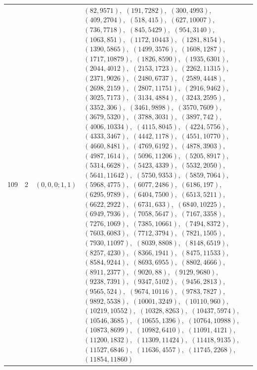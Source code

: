 \documentclass[11pt]{article}
\begin{document}
\begin{longtable}{@{}rrl>{\raggedright\arraybackslash}p{}@{}}
109 & 2 & $(0,0,0;1,1)$ & $(82,9571)$,\allowbreak\ $(191,7282)$,\allowbreak\ $(300,4993)$,\allowbreak\ $(409,2704)$,\allowbreak\ $(518,415)$,\allowbreak\ $(627,10007)$,\allowbreak\ $(736,7718)$,\allowbreak\ $(845,5429)$,\allowbreak\ $(954,3140)$,\allowbreak\ $(1063,851)$,\allowbreak\ $(1172,10443)$,\allowbreak\ $(1281,8154)$,\allowbreak\ $(1390,5865)$,\allowbreak\ $(1499,3576)$,\allowbreak\ $(1608,1287)$,\allowbreak\ $(1717,10879)$,\allowbreak\ $(1826,8590)$,\allowbreak\ $(1935,6301)$,\allowbreak\ $(2044,4012)$,\allowbreak\ $(2153,1723)$,\allowbreak\ $(2262,11315)$,\allowbreak\ $(2371,9026)$,\allowbreak\ $(2480,6737)$,\allowbreak\ $(2589,4448)$,\allowbreak\ $(2698,2159)$,\allowbreak\ $(2807,11751)$,\allowbreak\ $(2916,9462)$,\allowbreak\ $(3025,7173)$,\allowbreak\ $(3134,4884)$,\allowbreak\ $(3243,2595)$,\allowbreak\ $(3352,306)$,\allowbreak\ $(3461,9898)$,\allowbreak\ $(3570,7609)$,\allowbreak\ $(3679,5320)$,\allowbreak\ $(3788,3031)$,\allowbreak\ $(3897,742)$,\allowbreak\ $(4006,10334)$,\allowbreak\ $(4115,8045)$,\allowbreak\ $(4224,5756)$,\allowbreak\ $(4333,3467)$,\allowbreak\ $(4442,1178)$,\allowbreak\ $(4551,10770)$,\allowbreak\ $(4660,8481)$,\allowbreak\ $(4769,6192)$,\allowbreak\ $(4878,3903)$,\allowbreak\ $(4987,1614)$,\allowbreak\ $(5096,11206)$,\allowbreak\ $(5205,8917)$,\allowbreak\ $(5314,6628)$,\allowbreak\ $(5423,4339)$,\allowbreak\ $(5532,2050)$,\allowbreak\ $(5641,11642)$,\allowbreak\ $(5750,9353)$,\allowbreak\ $(5859,7064)$,\allowbreak\ $(5968,4775)$,\allowbreak\ $(6077,2486)$,\allowbreak\ $(6186,197)$,\allowbreak\ $(6295,9789)$,\allowbreak\ $(6404,7500)$,\allowbreak\ $(6513,5211)$,\allowbreak\ $(6622,2922)$,\allowbreak\ $(6731,633)$,\allowbreak\ $(6840,10225)$,\allowbreak\ $(6949,7936)$,\allowbreak\ $(7058,5647)$,\allowbreak\ $(7167,3358)$,\allowbreak\ $(7276,1069)$,\allowbreak\ $(7385,10661)$,\allowbreak\ $(7494,8372)$,\allowbreak\ $(7603,6083)$,\allowbreak\ $(7712,3794)$,\allowbreak\ $(7821,1505)$,\allowbreak\ $(7930,11097)$,\allowbreak\ $(8039,8808)$,\allowbreak\ $(8148,6519)$,\allowbreak\ $(8257,4230)$,\allowbreak\ $(8366,1941)$,\allowbreak\ $(8475,11533)$,\allowbreak\ $(8584,9244)$,\allowbreak\ $(8693,6955)$,\allowbreak\ $(8802,4666)$,\allowbreak\ $(8911,2377)$,\allowbreak\ $(9020,88)$,\allowbreak\ $(9129,9680)$,\allowbreak\ $(9238,7391)$,\allowbreak\ $(9347,5102)$,\allowbreak\ $(9456,2813)$,\allowbreak\ $(9565,524)$,\allowbreak\ $(9674,10116)$,\allowbreak\ $(9783,7827)$,\allowbreak\ $(9892,5538)$,\allowbreak\ $(10001,3249)$,\allowbreak\ $(10110,960)$,\allowbreak\ $(10219,10552)$,\allowbreak\ $(10328,8263)$,\allowbreak\ $(10437,5974)$,\allowbreak\ $(10546,3685)$,\allowbreak\ $(10655,1396)$,\allowbreak\ $(10764,10988)$,\allowbreak\ $(10873,8699)$,\allowbreak\ $(10982,6410)$,\allowbreak\ $(11091,4121)$,\allowbreak\ $(11200,1832)$,\allowbreak\ $(11309,11424)$,\allowbreak\ $(11418,9135)$,\allowbreak\ $(11527,6846)$,\allowbreak\ $(11636,4557)$,\allowbreak\ $(11745,2268)$,\allowbreak\ $(11854,11860)$\\

\end{longtable}
\end{document}
